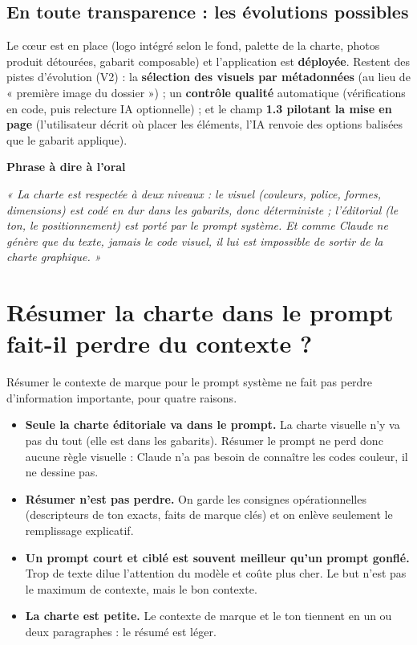 \documentclass[11pt,a4paper]{article}
\newcommand{\phrasea}[1]{%
  \begin{phrasebox}
  {\bfseries\color{gefblue}\textsf{Phrase à dire à l'oral}}\par\smallskip
  \itshape #1
  \end{phrasebox}%
}
\begin{document}
\subsection{En toute transparence : les évolutions possibles}
Le cœur est en place (logo intégré selon le fond, palette de la charte, photos produit
détourées, gabarit composable) et l'application est \textbf{déployée}. Restent des pistes
d'évolution (V2) : la \textbf{sélection des visuels par métadonnées} (au lieu de « première
image du dossier ») ; un \textbf{contrôle qualité} automatique (vérifications en code, puis
relecture IA optionnelle) ; et le champ \textbf{1.3 pilotant la mise en page} (l'utilisateur
décrit où placer les éléments, l'IA renvoie des options balisées que le gabarit applique).

\phrasea{« La charte est respectée à deux niveaux : le visuel (couleurs, police,
formes, dimensions) est codé en dur dans les gabarits, donc déterministe ;
l'éditorial (le ton, le positionnement) est porté par le prompt système. Et comme
Claude ne génère que du texte, jamais le code visuel, il lui est impossible de
sortir de la charte graphique. »}

\section{Résumer la charte dans le prompt fait-il perdre du contexte ?}

Résumer le contexte de marque pour le prompt système ne fait pas perdre
d'information importante, pour quatre raisons.

\begin{itemize}[leftmargin=1.4em]
  \item \textbf{Seule la charte éditoriale va dans le prompt.} La charte visuelle
        n'y va pas du tout (elle est dans les gabarits). Résumer le prompt ne perd
        donc aucune règle visuelle : Claude n'a pas besoin de connaître les codes
        couleur, il ne dessine pas.
  \item \textbf{Résumer n'est pas perdre.} On garde les consignes opérationnelles
        (descripteurs de ton exacts, faits de marque clés) et on enlève seulement
        le remplissage explicatif.
  \item \textbf{Un prompt court et ciblé est souvent meilleur qu'un prompt
        gonflé.} Trop de texte dilue l'attention du modèle et coûte plus cher. Le
        but n'est pas le maximum de contexte, mais le bon contexte.
  \item \textbf{La charte est petite.} Le contexte de marque et le ton tiennent en
        un ou deux paragraphes : le résumé est léger.
\end{itemize}
\end{document}
